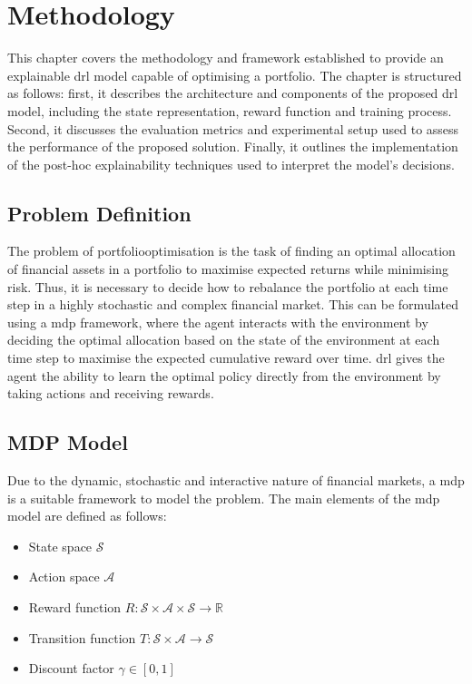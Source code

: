 \chapter{Methodology} \label{ch:methodology}

This chapter covers the methodology and framework established to provide an explainable \acrfull{drl} model capable of optimising a portfolio. The chapter is structured as follows: first, it describes the architecture and components of the proposed \acrshort{drl} model, including the state representation, reward function and training process. Second, it discusses the evaluation metrics and experimental setup used to assess the performance of the proposed solution. Finally, it outlines the implementation of the post-hoc explainability techniques used to interpret the model's decisions. 

\section{Problem Definition} \label{sec:problem-definition}

The problem of \gls{portfoliooptimisation} is the task of finding an optimal allocation of financial assets in a portfolio to maximise expected returns while minimising risk. Thus, it is necessary to decide how to rebalance the portfolio at each time step in a highly stochastic and complex financial market. This can be formulated using a \acrfull{mdp} framework, where the agent interacts with the environment by deciding the optimal allocation based on the state of the environment at each time step to maximise the expected cumulative reward over time. \acrfull{drl} gives the agent the ability to learn the optimal policy directly from the environment by taking actions and receiving rewards. 

\section{MDP Model} \label{sec:mdp-model}

Due to the dynamic, stochastic and interactive nature of financial markets, a \acrlong{mdp} is a suitable framework to model the problem. The main elements of the \acrshort{mdp} model are defined as follows:
\begin{itemize}
    \item State space $\mathcal{S}$
    \item Action space $\mathcal{A}$
    \item Reward function $R: \mathcal{S} \times \mathcal{A} \times \mathcal{S} \to \mathbb{R}$
    \item Transition function $T: \mathcal{S} \times \mathcal{A} \to \mathcal{S}$
    \item Discount factor $\gamma \in [0,1]$
\end{itemize}

